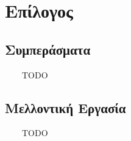 \chapter{Επίλογος}
\label{chap:Closing}

\section{Συμπεράσματα}

\ \ \ \ TODO

\section{Μελλοντική Εργασία}

\ \ \ \ TODO
